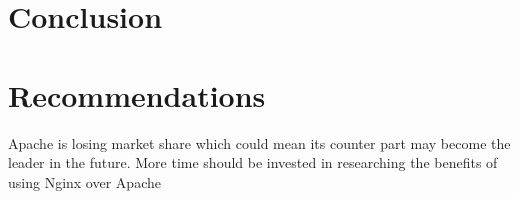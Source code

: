 \documentclass[a4paper,11pt]{article}
\numberwithin{figure}{section}
\begin{document}
\section{Conclusion}
\newpage
\section{Recommendations}
Apache is losing market share which could mean its counter part may become the leader in the future. More time should be invested in researching the benefits of using Nginx over Apache
\newpage




\newpage

\begin{appendices}
\begin{landscape}
\section{Research Mind Map}
	\label{sec:resmm}
	\centering
	\texttt{[image: \{RMM]}.jpg}
\end{landscape}
\end{appendices}
\end{document}
